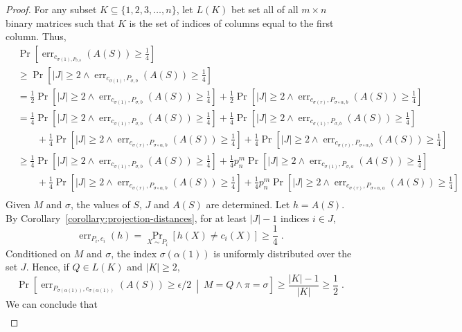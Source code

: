 \documentclass[10pt]{article}
\DeclareMathOperator{\err}{err}
\begin{document}
\begin{proof}
For any subset $K \subseteq \{1,2,3,\dots,n\}$, let $L(K)$ bet set all of all $m
\times n$ binary matrices such that $K$ is the set of indices of columns equal
to the first column. Thus,
\begin{align*}
& \Pr \left[ \err_{c_{\sigma(1),P_{\sigma, b}}}(A(S)) \ge \frac{1}{4} \right] \\
& \ge \Pr \left[ |J| \ge 2 \wedge \err_{c_{\sigma(1)},P_{\sigma, b}}(A(S)) \ge \frac{1}{4} \right] \\
& = \frac{1}{2} \Pr \left[ |J| \ge 2 \wedge \err_{c_{\sigma(1)},P_{\sigma, b}}(A(S)) \ge \frac{1}{4} \right] + \frac{1}{2} \Pr \left[ |J| \ge 2 \wedge \err_{c_{\sigma(r)},P_{\sigma \circ \alpha, b}}(A(S)) \ge \frac{1}{4} \right]  \\
& = \frac{1}{4} \Pr \left[ |J| \ge 2 \wedge \err_{c_{\sigma(1)},P_{\sigma, b}}(A(S)) \ge \frac{1}{4} \right] + \frac{1}{4} \Pr \left[ |J| \ge 2 \wedge \err_{c_{\sigma(1)},P_{\sigma, b}}(A(S)) \ge \frac{1}{4} \right] \\
& \qquad + \frac{1}{4} \Pr \left[ |J| \ge 2 \wedge \err_{c_{\sigma(r)},P_{\sigma \circ \alpha, b}}(A(S)) \ge \frac{1}{4} \right] + \frac{1}{4} \Pr \left[ |J| \ge 2 \wedge \err_{c_{\sigma(r)},P_{\sigma \circ \alpha, b}}(A(S)) \ge \frac{1}{4} \right] \\
& \ge \frac{1}{4} \Pr \left[ |J| \ge 2 \wedge \err_{c_{\sigma(1)},P_{\sigma, b}}(A(S)) \ge \frac{1}{4} \right] + \frac{1}{4} p_n^m  \Pr \left[ |J| \ge 2 \wedge \err_{c_{\sigma(1)},P_{\sigma, a}}(A(S)) \ge \frac{1}{4} \right] \\
& \qquad + \frac{1}{4} \Pr \left[ |J| \ge 2 \wedge \err_{c_{\sigma(r)},P_{\sigma \circ \alpha, b}}(A(S)) \ge \frac{1}{4} \right] + \frac{1}{4} p_n^m \Pr \left[ |J| \ge 2 \wedge \err_{c_{\sigma(r)},P_{\sigma \circ \alpha, a}}(A(S)) \ge \frac{1}{4} \right] \\
\end{align*}
Given $M$ and $\sigma$, the values of $S$, $J$ and $A(S)$ are determined.
Let $h = A(S)$. By Corollary~\ref{corollary:projection-distances}, for at least $|J| - 1$
indices $i \in J$,
$$
\err_{P_i,c_i}(h) = \Pr_{X \sim P_i} \left[ h(X) \neq  c_i(X) \right] \ge \frac{1}{4} \; .
$$
Conditioned on $M$ and $\sigma$, the index $\sigma(\alpha(1))$ is uniformly distributed over the set $J$. Hence, if $Q \in L(K)$ and $|K| \ge 2$,
$$
\Pr \left[ \err_{P_{\sigma(\alpha(1))},c_{\sigma(\alpha(1))}}(A(S)) \ge \epsilon/2 ~\middle|~ M = Q \wedge \pi = \sigma \right] \ge \frac{|K|-1}{|K|} \ge \frac{1}{2} \; .
$$
We can conclude that
\begin{align*}

\end{align*}
\end{proof}
\end{document}
